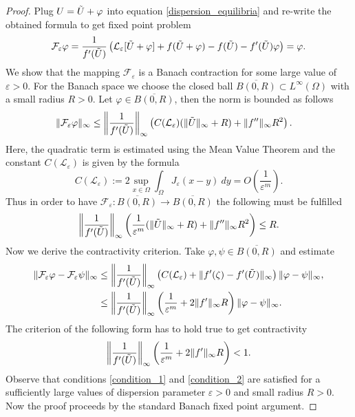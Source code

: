 \documentclass[12pt, a4paper]{article}
\theoremstyle{break}
\theoremstyle{break}
\theoremstyle{break}
\theoremstyle{break}
\theoremstyle{break}
\newcommand{\Leo}{\mathcal{L}_{\varepsilon}}
\begin{document}
\begin{proof}
    Plug $U = \Tilde{U} + \varphi$ into equation \eqref{dispersion_equilibria} and re-write the obtained formula to get fixed point problem
    $$\mathcal{F}_\varepsilon \varphi = \frac{1}{f'(\Tilde{U})}\left(\Leo [\Tilde{U} + \varphi] + f(\Tilde{U} + \varphi) - f(\Tilde{U}) - f'(\Tilde{U})\varphi\right) = \varphi.$$
    We show that the mapping $\mathcal{F}_\varepsilon$ is a Banach contraction for some large value of $\varepsilon > 0$. For the Banach space we choose the closed ball $\overline{B(0,R)} \subset L^\infty(\Omega)$ with a small radius $R > 0$.
    Let $\varphi \in \overline{B(0,R)}$, then the norm is bounded as follows
    \begin{align*}
        \|\mathcal{F}_\varepsilon \varphi \|_\infty
        &\leq \left\|\frac{1}{f'(\Tilde{U})}\right\|_\infty\left( C(\Leo)(\|\Tilde{U}\|_\infty  + R) +  \|f''\|_\infty R^2\right).
    \end{align*}
    Here, the quadratic term is estimated using the Mean Value Theorem and the constant $C(\Leo)$ is given by the formula
    $$C(\Leo) := 2 \sup_{x \in \Omega} \int_\Omega J_\varepsilon(x-y) \:dy = O(\frac{1}{\varepsilon^m}).$$ 
    Thus in order to have $\mathcal{F}_\varepsilon: \overline{B(0,R)} \rightarrow \overline{B(0,R)}$ the following must be fulfilled
    \begin{equation}
        \left\|\frac{1}{f'(\Tilde{U})}\right\|_\infty\left( \frac{1}{\varepsilon^m}(\|\Tilde{U}\|_\infty  + R) +  \|f''\|_\infty R^2\right) \leq R. \label{condition_1}
    \end{equation}
    Now we derive the contractivity criterion. Take $\varphi, \psi \in \overline{B(0,R)}$ and estimate
    \begin{align*}
        \|\mathcal{F}_\varepsilon \varphi - \mathcal{F}_\varepsilon \psi\|_\infty &\leq \left\|\frac{1}{f'(\Tilde{U})}\right\|_\infty \left( C(\Leo) + \|f'(\zeta) - f'(\Tilde{U})\|_\infty \right) \|\varphi - \psi\|_\infty, \\
        &\leq \left\| \frac{1}{f'(\Tilde{U})}\right\|_\infty\left( \frac{1}{\varepsilon^m} + 2\|f'\|_\infty R \right)\|\varphi - \psi\|_\infty.
    \end{align*}
    The criterion of the following form has to hold true to get contractivity
    \begin{equation}
        \left\| \frac{1}{f'(\Tilde{U})}\right\|_\infty\left( \frac{1}{\varepsilon^m} + 2\|f'\|_\infty R \right) < 1.
        \label{condition_2}
    \end{equation}
    Observe that conditions \eqref{condition_1} and \eqref{condition_2} are satisfied for a sufficiently large values of dispersion parameter $\varepsilon > 0$ and small radius $R > 0$. Now the proof proceeds by the standard Banach fixed point argument.
\end{proof}
\end{document}
